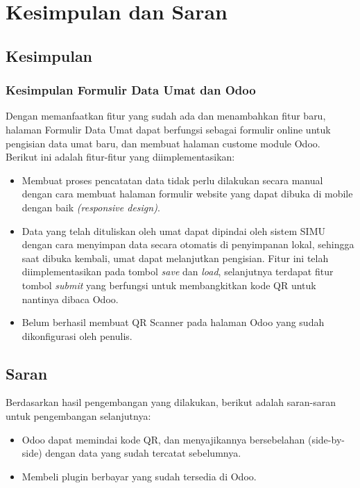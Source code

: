 \chapter{Kesimpulan dan Saran}
\label{chap:kesimpulandansaran}

\section{Kesimpulan}
\label{sec:kesimpulan}

\subsection{Kesimpulan Formulir Data Umat dan Odoo}
\label{sec:6:kesimpulanFormulir}

Dengan memanfaatkan fitur yang sudah ada dan menambahkan fitur baru, halaman Formulir Data Umat dapat berfungsi sebagai formulir online untuk pengisian data umat baru, dan membuat halaman custome module Odoo. Berikut ini adalah fitur-fitur yang diimplementasikan:
	
\begin{itemize}
	
	\item Membuat proses pencatatan data tidak perlu dilakukan secara manual dengan cara membuat halaman formulir website yang dapat dibuka di mobile dengan baik \textit{(responsive design)}.
	\item Data yang telah dituliskan oleh umat dapat dipindai oleh sistem SIMU dengan cara menyimpan data secara otomatis di penyimpanan lokal, sehingga saat dibuka kembali, umat dapat melanjutkan pengisian. Fitur ini telah diimplementasikan pada tombol \textit{save} dan \textit{load}, selanjutnya terdapat fitur tombol \textit{submit} yang berfungsi untuk membangkitkan kode QR untuk nantinya dibaca Odoo.
	\item Belum berhasil membuat QR Scanner pada halaman Odoo yang sudah dikonfigurasi oleh penulis.
\end{itemize}

\section{Saran}
\label{sec:saran}
Berdasarkan hasil pengembangan yang dilakukan, berikut adalah saran-saran untuk pengembangan selanjutnya:

\begin{itemize}
	\item Odoo dapat memindai kode QR, dan menyajikannya bersebelahan (side-by-side) dengan data yang sudah tercatat sebelumnya.
	\item Membeli plugin berbayar yang sudah tersedia di Odoo.
\end{itemize}

